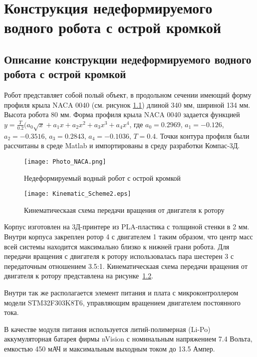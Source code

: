 \chapter{Конструкция недеформируемого водного робота с острой кромкой}\label{ch:ch5}

\section{Описание конструкции недеформируемого водного робота с острой кромкой}

Робот представляет собой полый объект, в продольном сечении имеющий форму профиля крыла NACA 0040 (см. рисунок \ref{Photo_NACA}) длиной 340 мм, шириной 134 мм. Высота робота 80 мм. Форма профиля крыла NACA 0040 задается функцией 
$ y = \frac{T}{0.2}(a_0\sqrt{x} + a_1x + a_2x^2 + a_3x^3 + a_4x^4 $, где $a_0=0.2969$, $a_1=-0.126$, $a_2=-0.3516$, $a_3=0.2843$, $a_4=-0.1036$, $T=0.4$. Точки контура профиля были рассчитаны в среде Matlab и импортированы в среду разработки Компас-3Д.	

\begin{figure}[h]
	\centering
	\texttt{[image: Photo\_NACA.png]}%
	\caption{Недеформируемый водный робот с острой кромкой}
	\label{Photo_NACA}
\end{figure}

\begin{figure}[h]
	\centering
	\texttt{[image: Kinematic\_Scheme2.eps]}%
	\caption{Кинематическаая схема передачи вращения от двигателя к ротору}
	\label{kinemSchemeNACA}
\end{figure}

Корпус изготовлен на 3Д-принтере из PLA-пластика с толщиной стенки в 2 мм. Внутри корпуса закреплен ротор 4 с двигателем 1 таким образом, что центр масс всей системы находится максимально близко к нижней грани робота. Для передачи вращения с двигателя к ротору использовалась пара шестерен 3 с передаточным отношением 3.5:1. Кинематическаая схема передачи вращения от двигателя к ротору представлена на рисунке~\ref{kinemSchemeNACA}.



Внутри так же располагается элемент питания и плата с микроконтроллером модели STM32F303K8T6, управляющим вращением двигателем постоянного тока. 

В качестве модуля питания используется литий-полимерная (Li-Po) аккумуляторная батарея фирмы nVision с номинальным напряжением 7.4 Вольта, емкостью 450 мАЧ и максимальным выходным током до 13.5 Ампер.


